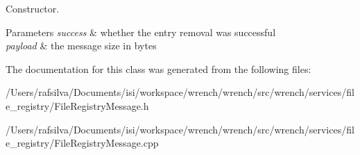 Constructor. 


\begin{DoxyParams}{Parameters}
{\em success} & whether the entry removal was successful \\
\hline
{\em payload} & the message size in bytes \\
\hline
\end{DoxyParams}


The documentation for this class was generated from the following files\+:\begin{DoxyCompactItemize}
\item 
/\+Users/rafsilva/\+Documents/isi/workspace/wrench/wrench/src/wrench/services/file\+\_\+registry/File\+Registry\+Message.\+h\item 
/\+Users/rafsilva/\+Documents/isi/workspace/wrench/wrench/src/wrench/services/file\+\_\+registry/File\+Registry\+Message.\+cpp\end{DoxyCompactItemize}
